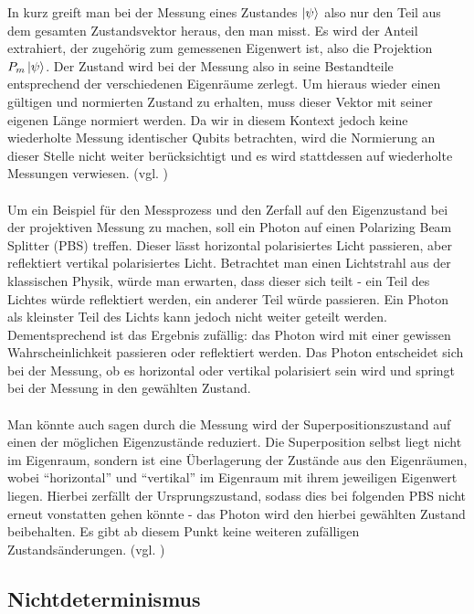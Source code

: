 In kurz greift man bei der Messung eines Zustandes $\ket\psi$ also nur den Teil aus dem gesamten Zustandsvektor heraus, den man misst. Es wird der Anteil extrahiert, der zugehörig zum gemessenen Eigenwert ist, also die Projektion $P_m \ket\psi$. Der Zustand wird bei der Messung also in seine Bestandteile entsprechend der verschiedenen Eigenräume zerlegt. Um hieraus wieder einen gültigen und normierten Zustand zu erhalten, muss dieser Vektor mit seiner eigenen Länge normiert werden. Da wir in diesem Kontext jedoch keine wiederholte Messung identischer Qubits betrachten, wird die Normierung an dieser Stelle nicht weiter berücksichtigt und es wird stattdessen auf wiederholte Messungen verwiesen. 
(vgl. \cite[Ch. 3.9]{kasirajan_fundamentals_2021})
\\ \\
Um ein Beispiel für den Messprozess und den Zerfall auf den Eigenzustand bei der projektiven Messung zu machen, soll ein Photon auf einen Polarizing Beam Splitter (PBS) treffen. Dieser lässt horizontal polarisiertes Licht passieren, aber reflektiert vertikal polarisiertes Licht.
Betrachtet man einen Lichtstrahl aus der klassischen Physik, würde man erwarten, dass dieser sich teilt - ein Teil des Lichtes würde reflektiert werden, ein anderer Teil würde passieren. Ein Photon als kleinster Teil des Lichts kann jedoch nicht weiter geteilt werden.
Dementsprechend ist das Ergebnis zufällig: das Photon wird mit einer gewissen Wahrscheinlichkeit passieren oder reflektiert werden. Das Photon entscheidet sich bei der Messung, ob es horizontal oder vertikal polarisiert sein wird und springt bei der Messung in den gewählten Zustand. \\ \\
Man könnte auch sagen durch die Messung wird der Superpositionszustand auf einen der möglichen Eigenzustände reduziert. Die Superposition selbst liegt nicht im Eigenraum, sondern ist eine Überlagerung der Zustände aus den Eigenräumen, wobei ``horizontal'' und ``vertikal'' im Eigenraum mit ihrem jeweiligen Eigenwert liegen. Hierbei zerfällt der Ursprungszustand, sodass dies bei folgenden PBS nicht erneut vonstatten gehen könnte - das Photon wird den hierbei gewählten Zustand beibehalten.
Es gibt ab diesem Punkt keine weiteren zufälligen Zustandsänderungen. 
(vgl. \cite[Ch. 1.4.1]{lvovsky_quantum_2018})

\subsection{Nichtdeterminismus}
\label{subsec: Nichtdeterminismus}

